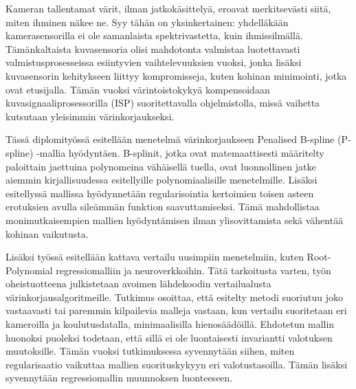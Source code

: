 Kameran tallentamat värit, ilman jatkokäsittelyä, eroavat merkitsevästi siitä, miten ihminen näkee ne. Syy tähän on yksinkertainen: yhdelläkään kamerasensorilla ei ole samanlaista spektrivastetta, kuin ihmissilmällä. Tämänkaltaista kuvasensoria olisi mahdotonta valmistaa luotettavasti valmistusprosesseissa esiintyvien vaihtelevuuksien vuoksi, jonka lisäksi kuvasensorin kehitykseen liittyy kompromisseja, kuten kohinan minimointi, jotka ovat etusijalla. Tämän vuoksi värintoistokykyä kompensoidaan kuvasignaaliprosessorilla (ISP) suoritettavalla ohjelmistolla, missä vaihetta kutsutaan yleisimmin värinkorjaukseksi.

Tässä diplomityössä esitellään menetelmä värinkorjaukseen Penalised B-spline (P-spline) -mallia hyödyntäen. B-splinit, jotka ovat matemaattisesti määritelty paloittain jaettuina polynomeina vähäisellä tuella, ovat luonnollinen jatke aiemmin kirjallisuudessa esitellyille polynomiaalisille menetelmille. Lisäksi esitellyssä mallissa hyödynnetään regularisointia kertoimien toisen asteen erotuksien avulla sileämmän funktion saavuttamiseksi. Tämä mahdollistaa monimutkaisempien mallien hyödyntämisen ilman ylisovittamista sekä vähentää kohinan vaikutusta.

Lisäksi työssä esitellään kattava vertailu uusimpiin menetelmiin, kuten Root-Polynomial regressiomalliin ja neuroverkkoihin. Tätä tarkoitusta varten, työn oheistuotteena julkistetaan avoimen lähdekoodin vertailualusta värinkorjausalgoritmeille. Tutkimus osoittaa, että esitelty metodi suoriutuu joko vastaavasti tai paremmin kilpailevia malleja vastaan, kun vertailu suoritetaan eri kameroilla ja koulutusdatalla, minimaalisilla hienosäädöillä. Ehdotetun mallin huonoksi puoleksi todetaan, että sillä ei ole luontaisesti invariantti valotuksen muutoksille. Tämän vuoksi tutkimuksessa syvennytään siihen, miten regularisaatio vaikuttaa mallien suorituskykyyn eri valotustasoilla. Tämän lisäksi syvennytään regressiomallin muunnoksen luonteeseen.